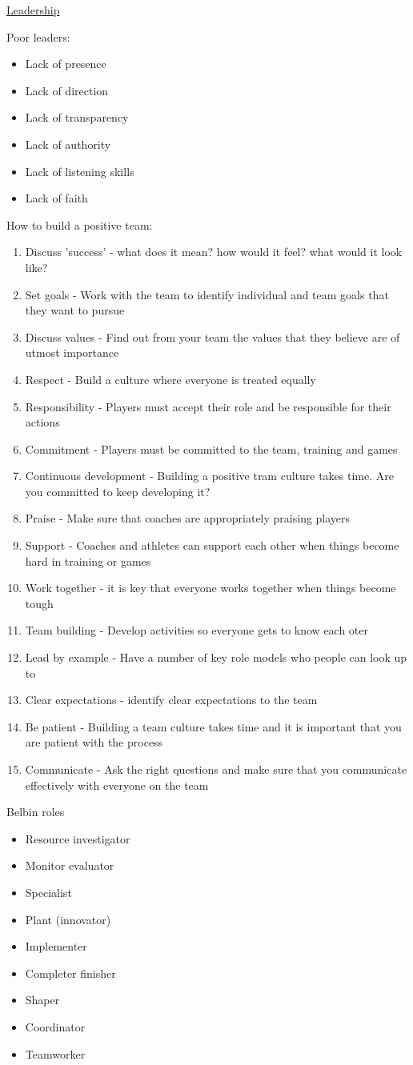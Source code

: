 \documentclass{article}[18pt]
\begin{document}
\begin{center}
\underline{\huge Leadership}
\end{center}
Poor leaders:
\begin{itemize}
	\item Lack of presence
	\item Lack of direction
	\item Lack of transparency
	\item Lack of authority
	\item Lack of listening skills
	\item Lack of faith
\end{itemize}
How to build a positive team:
\begin{enumerate}
	\item Discuss 'success' - what does it mean? how would it feel? what would it look like?
	\item Set goals - Work with the team to identify individual and team goals that they want to pursue
	\item Discuss values - Find out from your team the values that they believe are of utmost importance
	\item Respect - Build a culture where everyone is treated equally
	\item Responsibility - Players must accept their role and be responsible for their actions
	\item Commitment - Players must be committed to the team, training and games
	\item Continuous development - Building a positive tram culture takes time. Are you committed to keep developing it?
	\item Praise - Make sure that coaches are appropriately praising players
	\item Support - Coaches and athletes can support each other when things become hard in training or games
	\item Work together - it is key that everyone works together when things become tough
	\item Team building - Develop activities so everyone gets to know each oter
	\item Lead by example - Have a number of key role models who people can look up to
	\item Clear expectations - identify clear expectations to the team
	\item Be patient - Building a team culture takes time and it is important that you are patient with the process
	\item Communicate - Ask the right questions and make sure that you communicate effectively with everyone on the team
\end{enumerate}
Belbin roles
\begin{itemize}
	\item Resource investigator
	\item Monitor evaluator
	\item Specialist
	\item Plant (innovator)
	\item Implementer
	\item Completer finisher
	\item Shaper
	\item Coordinator
	\item Teamworker
\end{itemize}
\end{document}
